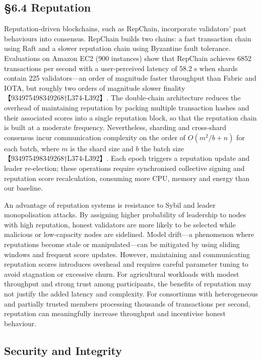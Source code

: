 \documentclass[12pt,onecolumn]{IEEEtran} %
\begin{document}
\subsection{\S6.4 Reputation}
\label{subsec:reputation-discussion}

Reputation‑driven blockchains, such as RepChain, incorporate validators’ past behaviours into consensus.  RepChain builds two chains: a fast transaction chain using Raft and a slower reputation chain using Byzantine fault tolerance.  Evaluations on Amazon EC2 (900 instances) show that RepChain achieves 6852 transactions per second with a user‑perceived latency of 58.2 s when shards contain 225 validators—an order of magnitude faster throughput than Fabric and IOTA, but roughly two orders of magnitude slower finality【934975498349268†L374-L392】.  The double‑chain architecture reduces the overhead of maintaining reputation by packing multiple transaction hashes and their associated scores into a single reputation block, so that the reputation chain is built at a moderate frequency.  Nevertheless, sharding and cross‑shard consensus incur communication complexity on the order of \(O(m^2/b + n)\) for each batch, where \(m\) is the shard size and \(b\) the batch size【934975498349268†L374-L392】.  Each epoch triggers a reputation update and leader re‑election; these operations require synchronised collective signing and reputation score recalculation, consuming more CPU, memory and energy than our baseline.

An advantage of reputation systems is resistance to Sybil and leader monopolisation attacks.  By assigning higher probability of leadership to nodes with high reputation, honest validators are more likely to be selected while malicious or low‑capacity nodes are sidelined.  Model drift—a phenomenon where reputations become stale or manipulated—can be mitigated by using sliding windows and frequent score updates.  However, maintaining and communicating reputation scores introduces overhead and requires careful parameter tuning to avoid stagnation or excessive churn.  For agricultural workloads with modest throughput and strong trust among participants, the benefits of reputation may not justify the added latency and complexity.  For consortiums with heterogeneous and partially trusted members processing thousands of transactions per second, reputation can meaningfully increase throughput and incentivise honest behaviour.

\subsection{Security and Integrity}
\label{subsec:security-integrity}
\end{document}
